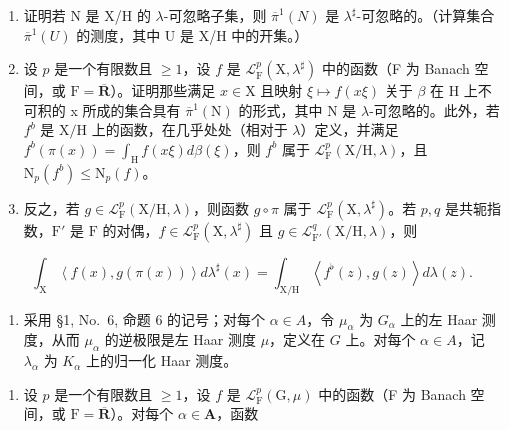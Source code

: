 \begin{enumerate}
\def\labelenumi{\alph{enumi})}
\item
  证明若 N 是 X/H 的 \(\lambda\)-可忽略子集，则 \(\overline{\pi}^{1}(N)\) 是 \(\lambda^{\sharp}\)-可忽略的。（计算集合 \(\overline{\pi}^{1}(U)\) 的测度，其中 U 是 X/H 中的开集。）
\item
  设 \(p\) 是一个有限数且 \(\geqslant 1\)，设 \(f\) 是 \(\mathcal{L}_{\mathrm{F}}^{p}(\mathrm{X},\lambda^{\sharp})\) 中的函数（F 为 Banach 空间，或 \(\mathrm{F} = \overline{\mathbf{R}}\)）。证明那些满足 \(x \in \mathrm{X}\) 且映射 \(\xi \mapsto f(x\xi)\) 关于 \(\beta\) 在 \(\mathrm{H}\) 上不可积的 x 所成的集合具有 \(\overline{\pi}^{1}(\mathrm{N})\) 的形式，其中 \(\mathrm{N}\) 是 \(\lambda\)-可忽略的。此外，若 \(f^b\) 是 \(\mathrm{X / H}\) 上的函数，在几乎处处（相对于 \(\lambda\)）定义，并满足 \(f^b (\pi (x)) = \int_{\mathrm{H}} f(x\xi) d\beta (\xi)\)，则 \(f^b\) 属于 \(\mathcal{L}_{\mathrm{F}}^{p}(\mathrm{X / H},\lambda)\)，且 \(\mathrm{N}_p(f^b)\leqslant \mathrm{N}_p(f)\)。
\item
  反之，若 \(g \in \mathcal{L}_{\mathrm{F}}^{p}(\mathrm{X / H}, \lambda)\)，则函数 \(g \circ \pi\) 属于 \(\mathcal{L}_{\mathrm{F}}^{p}(\mathrm{X}, \lambda^{\sharp})\)。若 \(p, q\) 是共轭指数，\(\mathrm{F}'\) 是 \(\mathrm{F}\) 的对偶，\(f \in \mathcal{L}_{\mathrm{F}}^{p}(\mathrm{X}, \lambda^{\sharp})\) 且 \(g \in \mathcal{L}_{\mathrm{F}'}^{q}(\mathrm{X / H}, \lambda)\)，则
\end{enumerate}

\[
\int_ {\mathrm{X}} \left\langle f (x), g (\pi (x)) \right\rangle d \lambda^ {\sharp} (x) = \int_ {\mathrm{X/H}} \left\langle f ^ {\flat} (z), g (z) \right\rangle d \lambda (z).
\]

\begin{enumerate}
\def\labelenumi{\arabic{enumi})}
\setcounter{enumi}{9}
\tightlist
\item
  采用 §1, No.~6, 命题 6 的记号；对每个 \(\alpha \in A\)，令 \(\mu_{\alpha}\) 为 \(G_{\alpha}\) 上的左 Haar 测度，从而 \(\mu_{\alpha}\) 的逆极限是左 Haar 测度 \(\mu\)，定义在 \(G\) 上。对每个 \(\alpha \in A\)，记 \(\lambda_{\alpha}\) 为 \(K_{\alpha}\) 上的归一化 Haar 测度。
\end{enumerate}

\begin{enumerate}
\def\labelenumi{\alph{enumi})}
\tightlist
\item
  设 \(p\) 是一个有限数且 \(\geqslant 1\)，设 \(f\) 是 \(\mathcal{L}_{\mathrm{F}}^{p}(\mathrm{G},\mu)\) 中的函数（F 为 Banach 空间，或 \(\mathrm{F} = \overline{\mathbf{R}}\)）。对每个 \(\alpha \in \mathbf{A}\)，函数
\end{enumerate}


